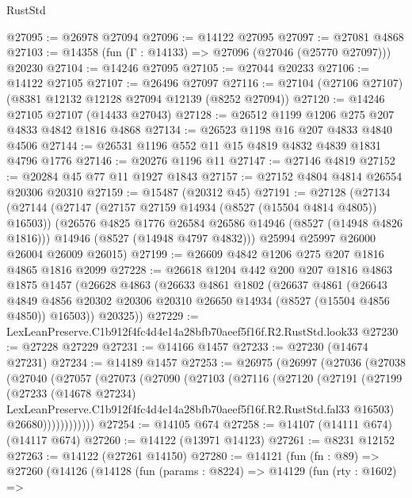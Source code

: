 \begin{lexlean}{RustStd}
\begin{coremodule}
@27095 := @26978 @27094
@27096 := @14122 @27095
@27097 := @27081 @4868
@27103 := @14358 (fun (Γ : @14133) => @27096 (@27046 (@25770 @27097))) @20230
@27104 := @14246 @27095
@27105 := @27044 @20233
@27106 := @14122 @27105
@27107 := @26496 @27097
@27116 := @27104 (@27106 @27107) (@8381 @12132 @12128 @27094 @12139 (@8252 @27094))
@27120 := @14246 @27105 @27107 (@14433 @27043)
@27128 := @26512 @1199 @1206 @275 @207 @4833 @4842 @1816 @4868
@27134 := @26523 @1198 @16 @207 @4833 @4840 @4506
@27144 := @26531 @1196 @552 @11 @15 @4819 @4832 @4839 @1831 @4796 @1776
@27146 := @20276 @1196 @11
@27147 := @27146 @4819
@27152 := @20284 @45 @77 @11 @1927 @1843
@27157 := @27152 @4804 @4814 @26554 @20306 @20310
@27159 := @15487 (@20312 @45)
@27191 := @27128
    (@27134
      (@27144
        (@27147 (@27157 @27159 @14934 (@8527 (@15504 @4814 @4805)) @16503))
        (@26576 @4825 @1776 @26584 @26586 @14946 (@8527 (@14948 @4826 @1816)))
        @14946
        (@8527 (@14948 @4797 @4832)))
      @25994
      @25997
      @26000
      @26004
      @26009
      @26015)
@27199 := @26609 @4842 @1206 @275 @207 @1816 @4865 @1816 @2099
@27228 := @26618
    @1204
    @442
    @200
    @207
    @1816
    @4863
    @1875
    @1457
    (@26628
      @4863
      (@26633
        @4861
        @1802
        (@26637
          @4861
          (@26643
            @4849
            @4856
            @20302
            @20306
            @20310
            @26650
            @14934
            (@8527 (@15504 @4856 @4850))
            @16503))
        @20325))
@27229 := LexLeanPreserve.C1b912f4fc4d4e14a28bfb70aeef5f16f.R2.RustStd.look33
@27230 := @27228 @27229
@27231 := @14166 @1457
@27233 := @27230 (@14674 @27231)
@27234 := @14189 @1457
@27253 := @26975
    (@26997
      (@27036
        (@27038
          (@27040
            (@27057
              (@27073
                (@27090
                  (@27103
                    (@27116
                      (@27120
                        (@27191
                          (@27199
                            (@27233
                              (@14678 @27234)
                              LexLeanPreserve.C1b912f4fc4d4e14a28bfb70aeef5f16f.R2.RustStd.fal33
                              @16503)
                            @26680))))))))))))
@27254 := @14105 @674
@27258 := @14107 (@14111 @674) (@14117 @674)
@27260 := @14122 (@13971 @14123)
@27261 := @8231 @12152
@27263 := @14122 (@27261 @14150)
@27280 := @14121
    (fun (fn : @89) =>
    @27260
      (@14126
        (@14128
          (fun (params : @8224) =>
          @14129
            (fun (rty : @1602) =>

\end{coremodule}
\end{lexlean}
